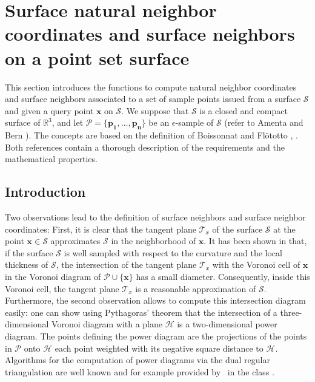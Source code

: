 \section{Surface natural neighbor coordinates and surface neighbors on
a point set surface}\label{sec:surface}

This section introduces the functions to compute natural neighbor
coordinates and surface neighbors associated to a set of sample points
issued from a surface $\mathcal{S}$ and given a query point
$\mathbf{x}$ on $\mathcal{S}$. We suppose that $\mathcal{S}$ is a
closed and compact surface of $\mathbb{R}^3$, and let $\mathcal{P}=
\{\mathbf{p_1}, \ldots,\mathbf{p_n}\}$ be an $\epsilon$-sample of
$\mathcal{S}$ (refer to Amenta and Bern \cite{ab-srvf-99}). The
concepts are based on the definition of Boissonnat and Fl\"ototto
\cite{bf-lcss-02}, \cite{prisme-these-flototto}.  Both references
contain a thorough description of the requirements and the
mathematical properties.

\subsection{Introduction}

Two observations lead to the definition of surface neighbors and
surface neighbor coordinates: First, it is clear that the tangent
plane $\mathcal{T}_x$ of the surface $\mathcal{S}$ at the point
$\mathbf{x} \in \mathcal{S}$ approximates $\mathcal{S}$ in the
neighborhood of $\mathbf{x}$. It has been shown in \cite{bf-lcss-02}
that, if the surface $\mathcal{S}$ is well sampled with respect to the
curvature and the local thickness of $\mathcal{S}$, the intersection
of the tangent plane $\mathcal{T}_x$ with the Voronoi cell of
$\mathbf{x}$ in the Voronoi diagram of $\mathcal{P} \cup
\{\mathbf{x}\}$ has a small diameter.  Consequently, inside this
Voronoi cell, the tangent plane $\mathcal{T}_x$ is a reasonable
approximation of $\mathcal{S}$. Furthermore, the second observation
allows to compute this intersection diagram easily: one can show using
Pythagoras' theorem that the intersection of a three-dimensional
Voronoi diagram with a plane $\mathcal{H}$ is a two-dimensional power
diagram. The points defining the power diagram are the projections of
the points in $\mathcal{P}$ onto $\mathcal{H}$ each point weighted
with its negative square distance to $\mathcal{H}$. Algorithms for the
computation of power diagrams via the dual regular triangulation are
well known and for example provided by \cgal\ in the class
.


